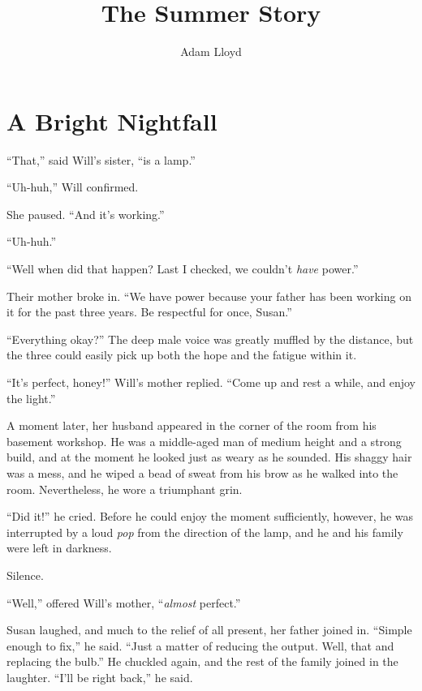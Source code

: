 \documentclass[12pt,letterpaper,oneside,english]{book}
\begin{document}
\title{The Summer Story}


\author{Adam Lloyd}

\maketitle
\tableofcontents{}


\chapter{A Bright Nightfall}

``That,'' said Will's sister, ``is a lamp.''

``Uh-huh,'' Will confirmed.

She paused. ``And it's working.''

``Uh-huh.''

``Well when did that happen? Last I checked, we couldn't \emph{have}
power.''

Their mother broke in. ``We have power because your father has
been working on it for the past three years. Be respectful for once,
Susan.''

``Everything okay?'' The deep male voice was greatly muffled by
the distance, but the three could easily pick up both the hope and
the fatigue within it.

``It's perfect, honey!'' Will's mother replied. ``Come up and
rest a while, and enjoy the light.''

A moment later, her husband appeared in the corner of the room from
his basement workshop. He was a middle-aged man of medium height and
a strong build, and at the moment he looked just as weary as he sounded.
His shaggy hair was a mess, and he wiped a bead of sweat from his
brow as he walked into the room. Nevertheless, he wore a triumphant
grin.

``Did it!'' he cried. Before he could enjoy the moment sufficiently,
however, he was interrupted by a loud \emph{pop} from the direction
of the lamp, and he and his family were left in darkness.

Silence.

``Well,'' offered Will's mother, ``\emph{almost} perfect.''

Susan laughed, and much to the relief of all present, her father joined
in. ``Simple enough to fix,'' he said. ``Just a matter of reducing
the output. Well, that and replacing the bulb.'' He chuckled again,
and the rest of the family joined in the laughter. ``I'll be right
back,'' he said.
\end{document}
